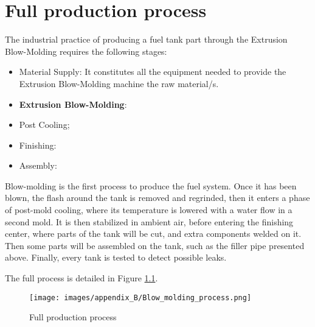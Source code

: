 \chapter{Full production process} \label{Full production process}

The industrial practice of producing a fuel tank part through the Extrusion Blow-Molding requires the following stages:

\begin{itemize}
    \item Material Supply: It constitutes all the equipment needed to provide the Extrusion Blow-Molding machine the raw material/s. 
    \item \textbf{Extrusion Blow-Molding}:
    \item Post Cooling; 
    \item Finishing: 
    \item Assembly:
\end{itemize}



Blow-molding is the first process to produce the fuel system. Once it has been blown, the flash around the tank is removed and regrinded, then it enters a phase of post-mold cooling, where its temperature is lowered with a water flow in a second mold. It is then stabilized in ambient air, before entering the finishing center, where parts of the tank will be cut, and extra components welded on it.
Then some parts will be assembled on the tank, such as the filler pipe presented above. Finally, every tank is tested to detect possible leaks.

The full process is detailed in Figure \ref{fig:Full_production_process}.

\begin{figure}
\centerline{\texttt{[image: images/appendix\_B/Blow\_molding\_process.png]}}
\caption{Full production process}
\label{fig:Full_production_process}
\end{figure}